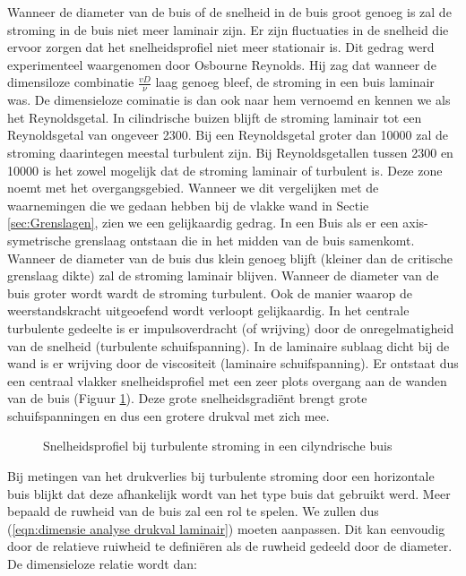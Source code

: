 Wanneer de diameter van de buis of de snelheid in de buis groot genoeg is zal de stroming in de buis niet meer laminair zijn. Er zijn fluctuaties in de snelheid die ervoor zorgen dat het snelheidsprofiel niet meer stationair is. Dit gedrag werd experimenteel waargenomen door Osbourne Reynolds. Hij zag dat wanneer de dimensiloze combinatie $\frac{v D}{\nu}$ laag genoeg bleef, de stroming in een buis laminair was. De dimensieloze cominatie is dan ook naar hem vernoemd en kennen we als het Reynoldsgetal.
\npar
In cilindrische buizen blijft de stroming laminair tot een Reynoldsgetal van ongeveer 2300. Bij een Reynoldsgetal groter dan 10000 zal de stroming daarintegen meestal turbulent zijn. Bij Reynoldsgetallen tussen 2300 en 10000 is het zowel mogelijk dat de stroming laminair of turbulent is. Deze zone noemt met het overgangsgebied.
\npar
Wanneer we dit vergelijken met de waarnemingen die we gedaan hebben bij de vlakke wand in Sectie \ref{sec:Grenslagen}, zien we een gelijkaardig gedrag. In een Buis als er een axis-symetrische grenslaag ontstaan die in het midden van de buis samenkomt. Wanneer de diameter van de buis dus klein genoeg blijft (kleiner dan de critische grenslaag dikte) zal de stroming laminair blijven. Wanneer de diameter van de buis groter wordt wardt de stroming turbulent. Ook de manier waarop de weerstandskracht uitgeoefend wordt verloopt gelijkaardig. In het centrale turbulente gedeelte is er impulsoverdracht (of wrijving) door de onregelmatigheid van de snelheid (turbulente schuifspanning). In de laminaire sublaag dicht bij de wand is er wrijving door de viscositeit (laminaire schuifspanning). Er ontstaat dus een centraal vlakker snelheidsprofiel met een zeer plots overgang aan de wanden van de buis (Figuur \ref{fig:turbulent_snelheidsprofiel}). Deze grote snelheidsgradi\"ent brengt grote schuifspanningen en dus een grotere drukval met zich mee. 
\begin{figure}
	\centering
	
	\caption{Snelheidsprofiel bij turbulente stroming in een cilyndrische buis}
	\label{fig:turbulent_snelheidsprofiel}
\end{figure}
\npar
Bij metingen van het drukverlies bij turbulente stroming door een horizontale buis blijkt dat deze afhankelijk wordt van het type buis dat gebruikt werd. Meer bepaald de ruwheid van de buis zal een rol te spelen. We zullen dus (\ref{eqn:dimensie analyse drukval laminair}) moeten aanpassen. Dit kan eenvoudig door de relatieve ruiwheid te defini\"eren als de ruwheid gedeeld door de diameter. De dimensieloze relatie wordt dan:
